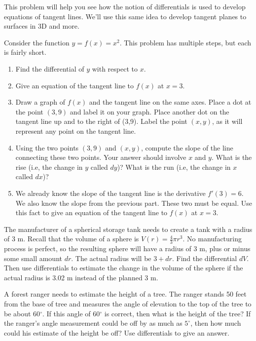 This problem will help you see how the notion of differentials is used to develop equations of tangent lines. We'll use this same idea to develop tangent planes to surfaces in 3D and more.
\begin{problem} \label{differentials give tangent
    lines}
Consider the function $y=f(x) = x^2$. This problem has multiple steps, but each is fairly short.
\begin{enumerate}
\item Find the differential of $y$ with respect to $x$.  
\item Give an equation of the tangent line to $f(x)$ at $x=3$.
\item Draw a graph of $f(x)$ and the tangent line on the same axes. Place a dot at the point $(3,9)$ and label it on your graph. Place another dot on the tangent line up and to the right of (3,9). Label the point $(x,y)$, as it will represent any point on the tangent line. 
\item Using the two points $(3,9)$ and $(x,y)$, compute the slope of the line connecting these two points. Your answer should involve $x$ and $y$. What is the rise (i.e, the change in $y$ called $dy$)? What is the run (i.e, the change in $x$ called $dx$)?  
\item We already know the slope of the tangent line is the derivative $f'(3)=6$. We also know the slope from the previous part. These two must be equal. Use this fact to give an equation of the tangent line to $f(x)$ at $x=3$. 
\end{enumerate}
\end{problem}
 
\begin{problem}  \label{diff-sphere}
The manufacturer of a spherical storage tank needs to create a tank with a radius of 3 m. Recall that the volume of a sphere is $V(r) = \frac{4}{3}\pi r^3$. No manufacturing process is perfect, so the resulting sphere will have a radius of 3 m, plus or minus some small amount $dr$. The actual radius will be $3+dr$. Find the differential $dV$.  Then use differentials to estimate the change in the volume of the sphere if the actual radius is 3.02 m instead of the planned 3 m.    
\end{problem}
 
\begin{problem}
A forest ranger needs to estimate the height of a tree.  The ranger stands 50 feet from the base of tree and measures the angle of elevation to the top of the tree to be about 60$^\circ$. If this angle of 60$^\circ$ is correct, then what is the height of the tree? If the ranger's angle measurement could be off by as much as $5^\circ$, then how much could his estimate of the height be off? Use differentials to give an answer.
\end{problem}




